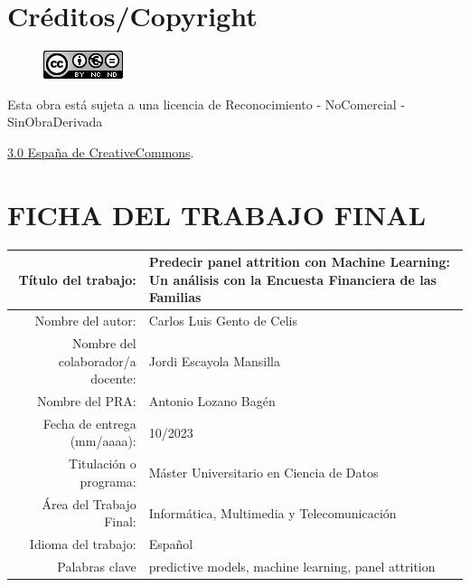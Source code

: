 \setcounter{page}{1} 
\pagestyle{plain}

\chapter*{Créditos/Copyright}

\vspace{1cm}

\begin{figure}[ht]
    \centering
	\includegraphics[scale=1]{images/license.png}
\end{figure}

Esta obra está sujeta a una licencia de Reconocimiento -  NoComercial - SinObraDerivada

\href{https://creativecommons.org/licenses/by-nc-nd/3.0/es/}{3.0 España de CreativeCommons}.

\chapter*{FICHA DEL TRABAJO FINAL}

\begin{table}[ht]
	\centering{}
	\renewcommand{\arraystretch}{2}
	\begin{tabular}{r | p{10cm}}
		\hline
		Título del trabajo: & Predecir panel attrition con Machine Learning: Un análisis con la Encuesta Financiera de las Familias\\
		\hline
        Nombre del autor: & Carlos Luis Gento de Celis\\
		\hline
        Nombre del colaborador/a docente: & Jordi Escayola Mansilla\\
		\hline
        Nombre del PRA: & Antonio Lozano Bagén\\
		\hline
        Fecha de entrega (mm/aaaa): & 10/2023\\
		\hline
        Titulación o programa: & Máster Universitario en Ciencia de Datos\\
		\hline
        Área del Trabajo Final: & Informática, Multimedia y Telecomunicación\\
		\hline
        Idioma del trabajo: & Español\\
		\hline
        Palabras clave & predictive models, machine learning, panel attrition\\
		\hline
	\end{tabular}
\end{table}

